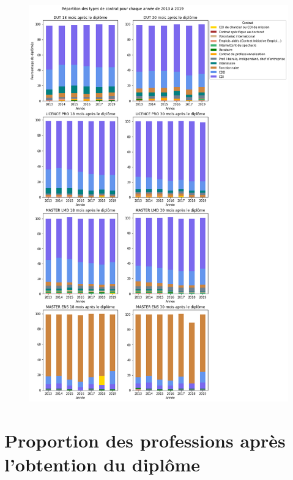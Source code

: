 \documentclass[12pt, a4paper, titlepage, table]{article}
\begin{document}
		\begin{figure}[H]
		\centering
		\includegraphics[width=1\textwidth]{../graphs/repartition_contrats_situation.png}
	\end{figure}

\section{Proportion des professions après l'obtention du diplôme}
\end{document}
